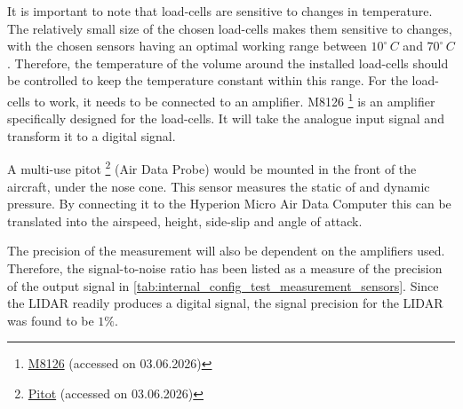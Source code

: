 It is important to note that load-cells are sensitive to changes in temperature. The relatively small size of the chosen load-cells makes them sensitive to changes, with the chosen sensors having an optimal working range between $10^{\circ}\,C $ and $70^{\circ}\,C $. Therefore, the temperature of the volume around the installed load-cells should be controlled to keep the temperature constant within this range. For the load-cells to work, it needs to be connected to an amplifier. M8126 \footnote{\label{foot:M8126}\href{https://www.srisensor.com/uploads/M8126-Users-Manual-V1.4-Eng11.pdf}{M8126} (accessed on 03.06.2026)} is an amplifier specifically designed for the load-cells. It will take the analogue input signal and transform it to a digital signal. 


A multi-use pitot \footnote{\label{foot:pitot}\href{https://www.althensensors.com/measurement-systems/pressure-and-temperature-measurement-system/aeroprobe/air-data-probes/}{Pitot} (accessed on 03.06.2026)} (Air Data Probe) would be mounted in the front of the aircraft, under the nose cone. This sensor measures the static of and dynamic pressure. By connecting it to the Hyperion Micro Air Data Computer  this can be translated into the airspeed, height, side-slip and angle of attack.

The precision of the measurement will also be dependent on the amplifiers used. Therefore, the signal-to-noise ratio has been listed as a measure of the precision of the output signal in \autoref{tab:internal_config_test_measurement_sensors}. Since the LIDAR readily produces a digital signal, the signal precision for the LIDAR was found to be $1 \%$. 

